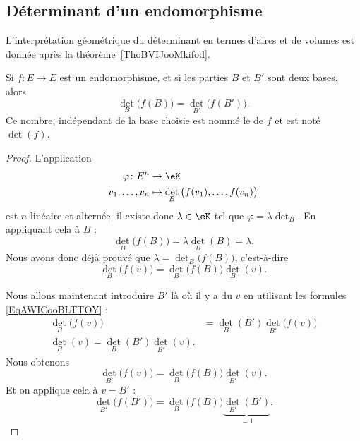 \subsection{Déterminant d'un endomorphisme}

L'interprétation géométrique du déterminant en termes d'aires et de volumes est donnée après la théorème~\ref{ThoBVIJooMkifod}.

\begin{lemmaDef}       \label{LEMooQTRVooAKzucd}      \label{DefCOZEooGhRfxA}
    Si \( f\colon E\to E\) est un endomorphisme, et si les parties \( B\) et \( B'\) sont deux bases, alors 
    \begin{equation}
        \det_B\big( f(B) \big)=\det_{B'}\big( f(B') \big).
    \end{equation}
    Ce nombre, indépendant de la base choisie est nommé le  de \( f\) et est noté \( \det(f)\).
\end{lemmaDef}

\begin{proof}
    L'application
    \begin{equation}
        \begin{aligned}
            \varphi\colon E^n&\to \eK \\
            v_1,\ldots, v_n&\mapsto \det_B\big( f(v_1),\ldots, f(v_n) \big)
        \end{aligned}
    \end{equation}
    est \( n\)-linéaire et alternée; il existe donc \( \lambda\in \eK\) tel que \( \varphi=\lambda\det_B\). En appliquant cela à \( B\) :
    \begin{equation}
        \det_B\big( f(B) \big)=\lambda \det_B(B)=\lambda.
    \end{equation}
    Nous avons donc déjà prouvé que \( \lambda=\det_B\big( f(B) \big)\), c'est-à-dire
    \begin{equation}
        \det_B\big( f(v) \big)=\det_B\big( f(B) \big)\det_B(v).
    \end{equation}

    Nous allons maintenant introduire \( B'\) là où il y a du \( v\) en utilisant les formules \eqref{EqAWICooBLTTOY} :
    \begin{subequations}
        \begin{align}
            \det_B\big( f(v) \big)&=\det_B(B')\det_{B'}\big( f(v) \big)\\
            \det_B(v)=\det_B(B')\det_{B'}(v).
        \end{align}
    \end{subequations}
    Nous obtenons
    \begin{equation}
        \det_{B'}\big( f(v) \big)=\det_B\big( f(B) \big)\det_{B'}(v).
    \end{equation}
    Et on applique cela à \( v=B'\) :
    \begin{equation}
        \det_{B'}\big( f(B') \big)=\det_B\big( f(B) \big)\underbrace{\det_{B'}(B')}_{=1}.
    \end{equation}
\end{proof}

